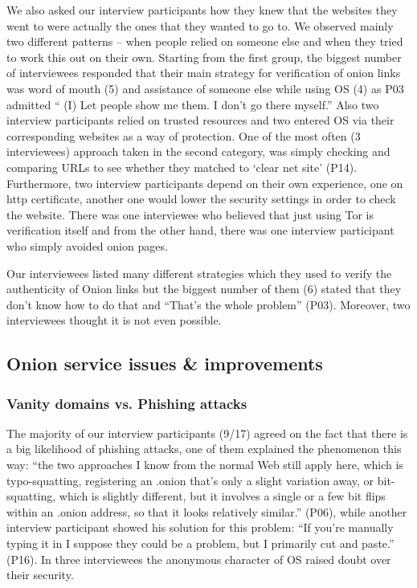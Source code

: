 We also asked our interview participants how they knew that the websites they went to were actually the ones that they wanted to go to.  We observed mainly two different patterns – when people relied on someone else and when they tried to work this out on their own. Starting from the first group, the biggest number of interviewees responded that their main strategy for verification of onion links was word of mouth (5) and assistance of someone else while using OS (4) as P03 admitted “ (I) Let people show me them. I don't go there myself.” Also two interview participants relied on trusted resources and two entered OS via their corresponding websites as a way of protection. One of the most often (3 interviewees) approach taken in the second category, was simply checking and comparing URLs to see whether they matched to ‘clear net site’ (P14). Furthermore, two interview participants depend on their own experience, one on http certificate, another one would lower the security settings in order to check the website. There was one interviewee who believed that just using Tor is verification itself and from the other hand, there was one interview participant who simply avoided onion pages.

Our interviewees listed many different strategies which they used to verify the authenticity of Onion links but the biggest number of them (6) stated that they don’t know how to do that and “That’s the whole problem” (P03). Moreover, two interviewees thought it is not even possible.


\subsection{Onion service issues \& improvements}
\label{sec:improve}

\subsubsection{Vanity domains vs. Phishing attacks}
The majority of our interview participants (9/17) agreed on the fact that there is a big likelihood of phishing attacks, one of them explained the phenomenon this way: “the two approaches I know from the normal Web still apply here, which is typo-squatting, registering an .onion that's only a slight variation away, or bit-squatting, which is slightly different, but it involves a single or a few bit flips within an .onion address, so that it looks relatively similar.” (P06), while another interview participant showed his solution for this problem: “If you're manually typing it in I suppose they could be a problem, but I primarily cut and paste.” (P16). In three interviewees the anonymous character of OS raised doubt over their security.

